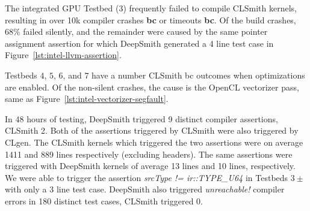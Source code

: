 The integrated GPU Testbed (3) frequently failed to compile CLSmith kernels, resulting in over 10k compiler crashes \textbf{bc} or timeouts \textbf{bc}.
Of the build crashes, 68\% failed silently, and the remainder were caused by the same pointer assignment assertion for which DeepSmith generated a 4 line test case in Figure~\ref{lst:intel-llvm-assertion}. 

Testbeds $4$, $5$, $6$, and $7$ have a number CLSmith bc outcomes when optimizations are enabled. Of the non-silent crashes, the cause is the OpenCL vectorizer pass, same as Figure~\ref{lst:intel-vectorizer-segfault}.



In 48 hours of testing, DeepSmith triggered 9 distinct compiler assertions, CLSmith 2. Both of the assertions triggered by CLSmith were also triggered by CLgen.
%
%
%
The CLSmith kernels which triggered the two assertions were on average 1411 and 889 lines respectively (excluding headers). The same assertions were triggered with DeepSmith kernels of average 13 lines and 10 lines, respectively. 
%
We were able to trigger the assertion \emph{srcType != ir::TYPE\_U64} in Testbeds $3\pm$ with only a 3 line test case.
%
DeepSmith also triggered \emph{unreachable!} compiler errors in 180 distinct test cases, CLSmith triggered 0.

